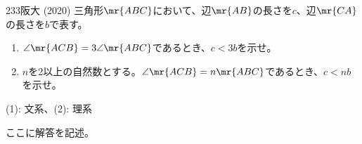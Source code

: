 \begin{thm}{233}{}{阪大 (2020)}
 三角形$\mr{ABC}$において、辺$\mr{AB}$の長さを$c$、辺$\mr{CA}$の長さを$b$で表す。
 \begin{enumerate}
  \item $\angle\mr{ACB}=3\angle\mr{ABC}$であるとき、$c<3b$を示せ。
  \item $n$を2以上の自然数とする。$\angle\mr{ACB}=n\mr{ABC}$であるとき、$c<nb$を示せ。
 \end{enumerate}
 \begin{flushright}
  {\small (1): 文系、(2): 理系}
 \end{flushright}
\end{thm}

ここに解答を記述。
